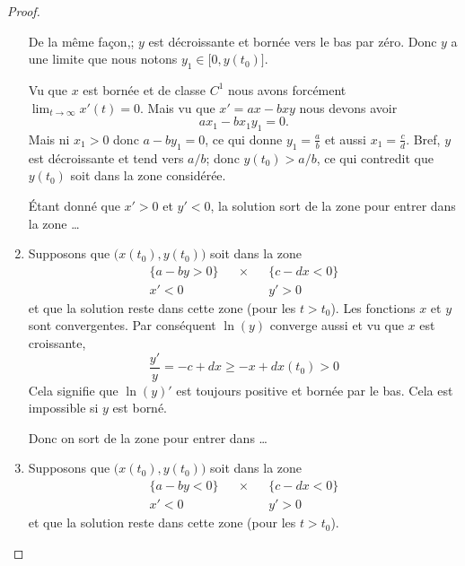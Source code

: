 \begin{proof}
\begin{subproof}
\begin{enumerate}
        De la même façon,; \( y\) est décroissante et bornée vers le bas par zéro. Donc $y$ a une limite que nous notons \( y_1\in\mathopen[ 0 , y(t_0) \mathclose]\).

        Vu que \( x\) est bornée et de classe \( C^1\) nous avons forcément \( \lim_{t\to \infty} x'(t)=0\). Mais vu que \( x'=ax-bxy\) nous devons avoir
        \begin{equation}
            ax_1-bx_1y_1=0.
        \end{equation}
        Mais ni \( x_1>0\) donc \( a-by_1=0\), ce qui donne \( y_1=\frac{ a }{ b }\) et aussi \( x_1=\frac{ c }{ d }\). Bref, \( y\) est décroissante et tend vers \( a/b\); donc \( y(t_0)>a/b\), ce qui contredit que \( y(t_0)\) soit dans la zone considérée.

        Étant donné que \( x'>0\) et \( y'<0\), la solution sort de la zone pour entrer dans la zone \ldots
    \item
        Supposons que \( \big( x(t_0),y(t_0) \big) \) soit dans la zone
        \begin{subequations}
            \begin{align}
                \{ a-by>0 \}&&\times&& \{ c-dx<0 \}\\
                x'<0&&&&y'>0
            \end{align}
        \end{subequations}
        et que la solution reste dans cette zone (pour les \( t>t_0\)). Les fonctions \( x\) et \( y\) sont convergentes. Par conséquent \( \ln(y)\) converge aussi et vu que \( x\) est croissante,
        \begin{equation}
            \frac{ y' }{ y }=-c+dx\geq -x+dx(t_0)>0
        \end{equation}
        Cela signifie que \( \ln(y)'\) est toujours positive et bornée par le bas. Cela est impossible si \( y\) est borné.

        Donc on sort de la zone pour entrer dans \ldots
    \item
        Supposons que \( \big( x(t_0),y(t_0) \big) \) soit dans la zone
        \begin{subequations}
            \begin{align}
                \{ a-by<0 \}&&\times&& \{ c-dx<0 \}\\
                x'<0&&&&y'>0
            \end{align}
        \end{subequations}
        et que la solution reste dans cette zone (pour les \( t>t_0\)).


\end{enumerate}
\end{subproof}
\end{proof}
